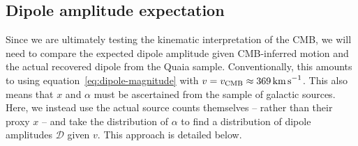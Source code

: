 \documentclass[fleqn,usenatbib]{mnras}
\begin{document}

    \subsection{Dipole amplitude expectation}
        Since we are ultimately testing the kinematic interpretation of the CMB, we will need to compare the expected dipole amplitude given CMB-inferred motion and the actual recovered dipole from the Quaia sample. 
        Conventionally, this amounts to using equation~\eqref{eq:dipole-magnitude} with $v = v_{\text{CMB}} \approx 369\,\text{km\,s}^{-1}$. 
        This also means that $x$ and $\alpha$ must be ascertained from the sample of galactic sources. 
        Here, we instead use the actual source counts themselves -- rather than their proxy $x$ -- and take the distribution of $\alpha$ to find a distribution of dipole amplitudes $\mathcal{D}$ given $v$.
        This approach is detailed below.
\end{document}

